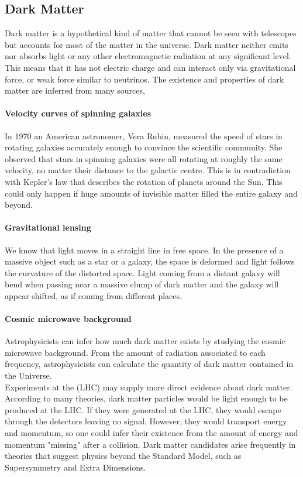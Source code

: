 \subsection{Dark Matter}

Dark matter is a hypothetical kind of matter that cannot be seen with telescopes but accounts for most of the matter in the universe. Dark matter neither emits nor absorbs light or any other electromagnetic radiation at any significant level. This means that it has not electric charge and can interact only via gravitational force, or weak force similar to neutrinos.
The existence and properties of dark matter are inferred from many sources,
\paragraph{Velocity curves of spinning galaxies} In 1970 an American astronomer, Vera Rubin, measured the speed of stars in rotating galaxies accurately enough to convince the scientific community. She observed that stars in spinning galaxies were all rotating at roughly the same velocity, no matter their distance to the galactic centre. This is in contradiction with Kepler’s law that describes the rotation of planets around the Sun.  This could only happen if huge amounts of invisible matter filled the entire galaxy and beyond.
\paragraph{Gravitational lensing} We know that light moves in a straight line in free space. In the presence of a massive object such as a star or a galaxy, the space is deformed and light follows the curvature of the distorted space. Light coming from a distant galaxy will bend when passing near a massive clump of dark matter and the galaxy will appear shifted, as if coming from different places.
\paragraph{Cosmic microwave background} Astrophysicists can infer how much dark matter exists by studying the cosmic microwave background. From the amount of radiation associated to each frequency, astrophysicists can calculate the quantity of dark matter contained in the Universe.\\

\indent Experiments at the (LHC) may supply more direct evidence about dark matter. According to many theories, dark matter particles would be light enough to be produced at the LHC. If they were generated at the LHC, they would escape through the detectors leaving no signal. However, they would transport energy and momentum, so one could infer their existence from the amount of energy and momentum "missing" after a collision. Dark matter candidates arise frequently in theories that suggest physics beyond the Standard Model, such as Supersymmetry and Extra Dimensions.

